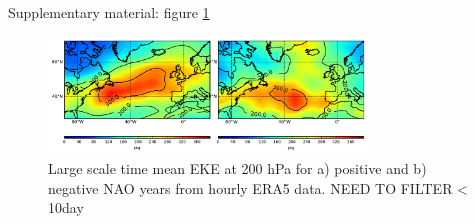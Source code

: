 

Supplementary material: figure \ref{fig:ERA5_EKE200_NAO}

\begin{figure}[h]
	\centering
	\includegraphics[width=20pc]{ERA5_EKE200_subplot.pdf}
	\caption{Large scale time mean EKE at 200 hPa for a) positive and b) negative NAO years from hourly ERA5 data. NEED TO FILTER < 10day}
	\label{fig:ERA5_EKE200_NAO}
\end{figure}

